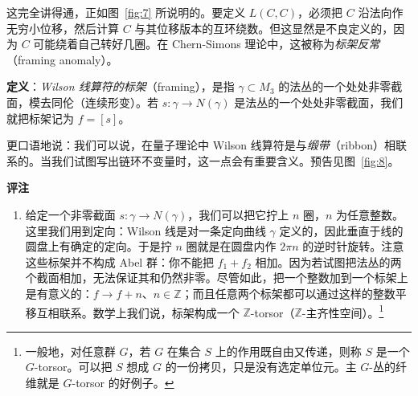 这完全讲得通，正如图~\ref{fig:7} 所说明的。要定义 $L(C,C)$，必须把 $C$ 沿法向作无穷小位移，然后计算 $C$ 与其位移版本的互环绕数。但这显然是不良定义的，因为 $C$ 可能绕着自己转好几圈。在 Chern-Simons 理论中，这被称为\emph{标架反常}（framing anomaly）。

\textbf{定义}：\emph{Wilson 线算符的标架}（framing），是指 $\gamma\subset M_3$ 的法丛的一个处处非零截面，模去同伦（连续形变）。若 $s:\gamma\to N(\gamma)$ 是法丛的一个处处非零截面，我们就把标架记为 $f=[s]$。

更口语地说：我们可以说，在量子理论中 Wilson 线算符是与\emph{缎带}（ribbon）相联系的。当我们试图写出链环不变量时，这一点会有重要含义。预告见图~\ref{fig:8}。

\textbf{评注}

\begin{enumerate}
  \item 给定一个非零截面 $s:\gamma\to N(\gamma)$，我们可以把它拧上 $n$ 圈，$n$ 为任意整数。这里我们用到定向：Wilson 线是对一条定向曲线 $\gamma$ 定义的，因此垂直于线的圆盘上有确定的定向。于是拧 $n$ 圈就是在圆盘内作 $2\pi n$ 的逆时针旋转。注意这些标架并不构成 Abel 群：你不能把 $f_1+f_2$ 相加。因为若试图把法丛的两个截面相加，无法保证其和仍然非零。尽管如此，把一个整数加到一个标架上是有意义的：$f\to f+n$、$n\in\mathbb{Z}$；而且任意两个标架都可以通过这样的整数平移互相联系。数学上我们说，标架构成一个 $\mathbb{Z}$-torsor（$\mathbb{Z}$-主齐性空间）。\footnote{一般地，对任意群 $G$，若 $G$ 在集合 $S$ 上的作用既自由又传递，则称 $S$ 是一个 $G$-torsor。可以把 $S$ 想成 $G$ 的一份拷贝，只是没有选定单位元。主 $G$-丛的纤维就是 $G$-torsor 的好例子。}


\end{enumerate}
